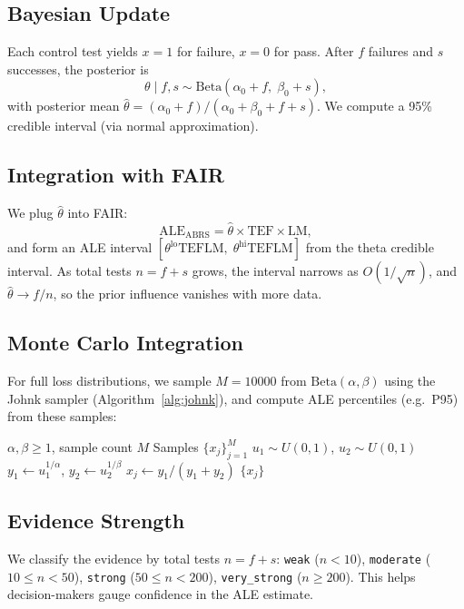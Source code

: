 \documentclass[conference]{IEEEtran}
\newcommand{\ABRS}{\mathrm{ABRS}}
\newcommand{\ALE}{\mathrm{ALE}}
\newcommand{\TEF}{\mathrm{TEF}}
\newcommand{\LM}{\mathrm{LM}}
\begin{document}
\subsection{Bayesian Update}
Each control test yields $x=1$ for failure, $x=0$ for pass. After $f$ failures and $s$ successes, the posterior is
\[
  \theta \mid f,s \sim \mathrm{Beta}(\alpha_0+f,\;\beta_0+s),
\]
with posterior mean $\hat\theta = (\alpha_0+f)/(\alpha_0+\beta_0+f+s)$. We compute a 95\% credible interval (via normal approximation).

\subsection{Integration with FAIR}
We plug $\hat\theta$ into FAIR: 
\[
  \ALE_{\ABRS} = \hat\theta \times \TEF \times \LM,
  \label{eq:abrs_ale}
\]
and form an ALE interval $[\theta^{\mathrm{lo}}\TEF\LM,\;\theta^{\mathrm{hi}}\TEF\LM]$ from the theta credible interval. As total tests $n=f+s$ grows, the interval narrows as $O(1/\sqrt{n})$, and $\hat\theta\to f/n$, so the prior influence vanishes with more data.

\subsection{Monte Carlo Integration}
For full loss distributions, we sample $M=10000$ from $\mathrm{Beta}(\alpha,\beta)$ using the Johnk sampler (Algorithm~\ref{alg:johnk}), and compute ALE percentiles (e.g.\ P95) from these samples:
\begin{algorithm}
  \caption{Johnk sampler for $\mathrm{Beta}(\alpha,\beta)$}
  \label{alg:johnk}
  \begin{algorithmic}[1]
    \Require $\alpha,\beta \ge 1$, sample count $M$
    \Ensure Samples $\{x_j\}_{j=1}^M$
      \Repeat
        \State $u_1 \sim U(0,1)$, $u_2 \sim U(0,1)$
        \State $y_1 \leftarrow u_1^{1/\alpha}$, $y_2 \leftarrow u_2^{1/\beta}$
      \State $x_j \leftarrow y_1/(y_1 + y_2)$
    \EndFor
    \State \Return $\{x_j\}$
  \end{algorithmic}
\end{algorithm}

\subsection{Evidence Strength}
We classify the evidence by total tests $n=f+s$: \texttt{weak} ($n<10$), \texttt{moderate} ($10\le n<50$), \texttt{strong} ($50\le n<200$), \texttt{very\_strong} ($n\ge200$). This helps decision-makers gauge confidence in the ALE estimate.
\end{document}
